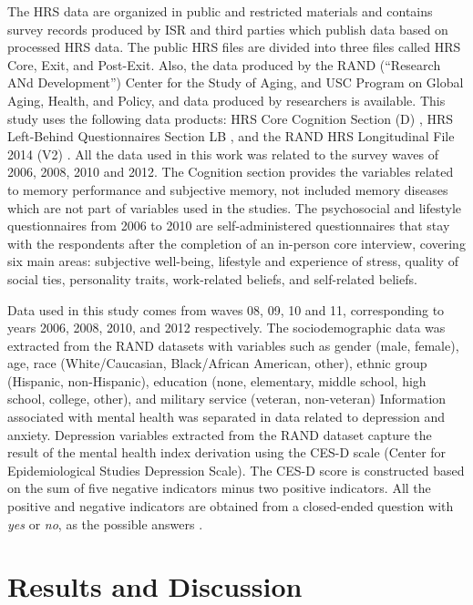 \documentclass[conference]{IEEEtran}
\begin{document}
The HRS data are organized in public and restricted materials and
contains survey records produced by ISR and third parties which publish
data based on processed HRS data. The public HRS files are divided into
three files called HRS Core, Exit, and Post-Exit. Also, the data
produced by the RAND (``Research ANd Development'') Center for the Study
of Aging, and USC Program on Global Aging, Health, and Policy, and data
produced by researchers is available. This study uses the following data
products: HRS Core Cognition Section (D) \cite{sonnega2014health}, HRS
Left-Behind Questionnaires Section LB \cite{smith2013psychosocial}, and
the RAND HRS Longitudinal File 2014 (V2) \cite{HRS2014}. All the data
used in this work was related to the survey waves of 2006, 2008, 2010
and 2012. The Cognition section provides the variables related to memory
performance and subjective memory, not included memory diseases which
are not part of variables used in the studies. The psychosocial and
lifestyle questionnaires from 2006 to 2010 are self-administered
questionnaires that stay with the respondents after the completion of an
in-person core interview, covering six main areas: subjective
well-being, lifestyle and experience of stress, quality of social ties,
personality traits, work-related beliefs, and self-related beliefs.

Data used in this study comes from waves 08, 09, 10 and 11,
corresponding to years 2006, 2008, 2010, and 2012 respectively. The
sociodemographic data was extracted from the RAND datasets with
variables such as gender (male, female), age, race (White/Caucasian,
Black/African American, other), ethnic group (Hispanic, non-Hispanic),
education (none, elementary, middle school, high school, college,
other), and military service (veteran, non-veteran) Information
associated with mental health was separated in data related to
depression and anxiety. Depression variables extracted from the RAND
dataset capture the result of the mental health index derivation using
the CES-D scale (Center for Epidemiological Studies Depression Scale).
The CES-D score is constructed based on the sum of five negative
indicators minus two positive indicators. All the positive and negative
indicators are obtained from a closed-ended question with \emph{yes} or
\emph{no}, as the possible answers \cite{cesd}.

\hypertarget{results-and-discussion}{%
\section{Results and Discussion}\label{results-and-discussion}}
\end{document}
